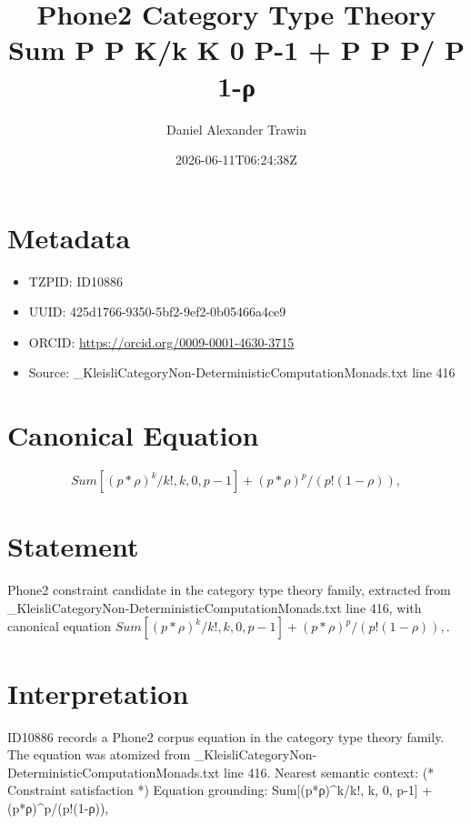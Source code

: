 \documentclass[11pt]{article}
\title{Phone2 Category Type Theory Sum P Ρ K/k K 0 P-1 + P Ρ P/ P 1-ρ}
\author{Daniel Alexander Trawin}
\date{2026-06-11T06:24:38Z}
\begin{document}
\maketitle
\section*{Metadata}
\begin{itemize}
\item TZPID: ID10886
\item UUID: 425d1766-9350-5bf2-9ef2-0b05466a4ce9
\item ORCID: \url{https://orcid.org/0009-0001-4630-3715}
\item Source: _KleisliCategoryNon-DeterministicComputationMonads.txt line 416
\end{itemize}
\section*{Canonical Equation}
\[
Sum[(p*ρ)^k/k!, {k, 0, p-1}] + (p*ρ)^p/(p!(1-ρ)),
\]
\section*{Statement}
Phone2 constraint candidate in the category type theory family, extracted from _KleisliCategoryNon-DeterministicComputationMonads.txt line 416, with canonical equation $Sum[(p*ρ)^k/k!, {k, 0, p-1}] + (p*ρ)^p/(p!(1-ρ)),$.
\section*{Interpretation}
ID10886 records a Phone2 corpus equation in the category type theory family. The equation was atomized from _KleisliCategoryNon-DeterministicComputationMonads.txt line 416. Nearest semantic context: (* Constraint satisfaction *) Equation grounding: Sum[(p*ρ)^k/k!, {k, 0, p-1}] + (p*ρ)^p/(p!(1-ρ)),
\end{document}

